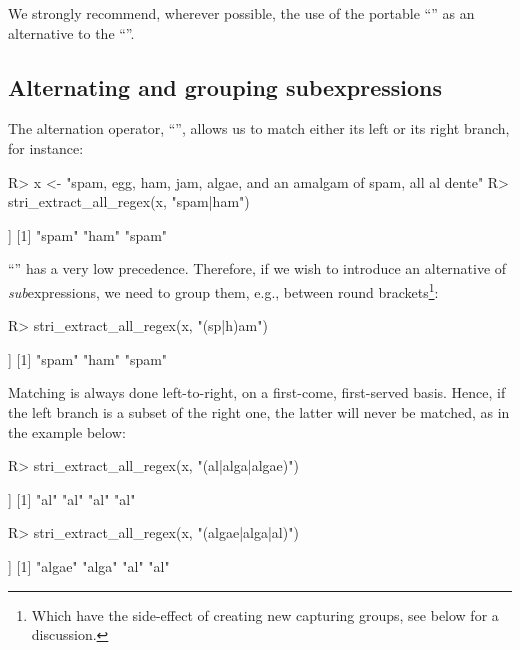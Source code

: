 \documentclass[nojss]{jss}\usepackage[]{graphicx}\usepackage[]{color}
\begin{document}
We strongly recommend, wherever possible, the use of the portable
``''
as an alternative to the  ``\code{[:punct:]}''.



\subsection{Alternating and grouping subexpressions}

The alternation operator, ``\code{|}'',
allows us to match either its left or its right branch,
for instance:

\begin{Schunk}
\begin{Sinput}
R> x <- "spam, egg, ham, jam, algae, and an amalgam of spam, all al dente"
R> stri_extract_all_regex(x, "spam|ham")
\end{Sinput}
\begin{Soutput}
[[1]]
[1] "spam" "ham"  "spam"
\end{Soutput}
\end{Schunk}

``\code{|}'' has a very low precedence. Therefore, if we wish to
introduce an alternative of \textit{sub}expressions,
we need to group them, e.g., between round brackets\footnote{Which have
the side-effect of creating new capturing groups, see below for a discussion.}:

\begin{Schunk}
\begin{Sinput}
R> stri_extract_all_regex(x, "(sp|h)am")
\end{Sinput}
\begin{Soutput}
[[1]]
[1] "spam" "ham"  "spam"
\end{Soutput}
\end{Schunk}

Matching is always done left-to-right, on a first-come, first-served basis.
Hence, if the left branch is a subset of the right one, the latter will
never be matched, as in the example below:

\begin{Schunk}
\begin{Sinput}
R> stri_extract_all_regex(x, "(al|alga|algae)")
\end{Sinput}
\begin{Soutput}
[[1]]
[1] "al" "al" "al" "al"
\end{Soutput}
\begin{Sinput}
R> stri_extract_all_regex(x, "(algae|alga|al)")
\end{Sinput}
\begin{Soutput}
[[1]]
[1] "algae" "alga"  "al"    "al"
\end{Soutput}
\end{Schunk}
\end{document}
